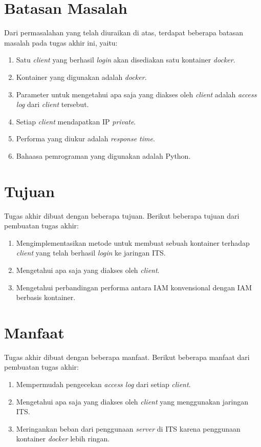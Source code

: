 	\section{Batasan Masalah}
	 Dari permasalahan yang telah diuraikan di atas, terdapat beberapa batasan masalah pada tugas akhir ini, yaitu:
	\begin{enumerate}
     \item Satu \textit{client} yang berhasil \textit{login} akan disediakan satu kontainer \textit{docker}.
     \item Kontainer yang digunakan adalah \textit{docker}.
	 \item Parameter untuk mengetahui apa saja yang diakses oleh \textit{client} adalah \textit{access log} dari \textit{client} tersebut.
	 \item Setiap \textit{client} mendapatkan IP \textit{private}.
     \item Performa yang diukur adalah \textit{response time}.
     \item Bahaasa pemrograman yang digunakan adalah Python.
	\end{enumerate}
    
   \section{Tujuan}
	Tugas akhir dibuat dengan beberapa tujuan. Berikut beberapa tujuan dari pembuatan tugas akhir:
	\begin{enumerate}
	 \item Mengimplementasikan metode untuk membuat sebuah kontainer terhadap \textit{client} yang telah berhasil \textit{login} ke jaringan ITS.
	 \item Mengetahui apa saja yang diakses oleh \textit{client}.
	 \item Mengetahui perbandingan performa antara IAM konvensional dengan IAM berbasis kontainer.
	\end{enumerate}
     
     \section{Manfaat}
	 Tugas akhir dibuat dengan beberapa manfaat. Berikut beberapa manfaat dari pembuatan tugas akhir:
	 \begin{enumerate}
	  \item Mempermudah pengecekan \textit{access log} dari setiap \textit{client}.
	  \item Mengetahui apa saja yang diakses oleh \textit{client} yang menggunakan jaringan ITS.
	  \item Meringankan beban dari penggunaan \textit{server} di ITS karena penggunaan kontainer \textit{docker} lebih ringan.
	 \end{enumerate}      
     
